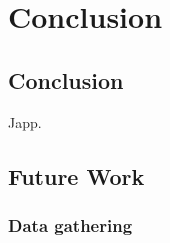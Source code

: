 \chapter{Conclusion}\label{cha:conclusions}

\section{Conclusion}\label{sec:research:history}
Japp.

\section{Future Work}\label{sec:research:history}

\subsection{Data gathering}\label{sec:research:history}
